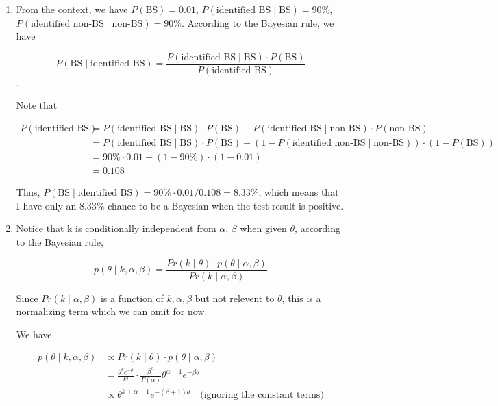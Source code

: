 \documentclass[11pt]{article}
\begin{document}

\begin{enumerate}
    \item From the context, we have $P(\text{BS}) = 0.01$, 
    $P(\text{identified BS} \mid \text{BS}) = 90\%$,
     $P(\text{identified non-BS} \mid \text{non-BS}) = 90\%$.
    According to the Bayesian rule, we have

    $$
    P(\text{BS} \mid \text{identified BS}) = \frac{P(\text{identified BS} \mid \text{BS}) \cdot P(\text{BS})}{P(\text{identified BS})}
    $$.

    Note that

    $$
    \begin{aligned}
        P(\text{identified BS}) 
        &= P(\text{identified BS} \mid \text{BS}) \cdot P(\text{BS}) + P(\text{identified BS} \mid \text{non-BS}) \cdot P(\text{non-BS}) \\
        &= P(\text{identified BS} \mid \text{BS}) \cdot P(\text{BS}) + (1 - P(\text{identified non-BS} \mid \text{non-BS})) \cdot (1 - P(\text{BS})) \\
        &= 90\% \cdot 0.01 + (1 - 90\%) \cdot (1 - 0.01) \\
        &= 0.108
    \end{aligned}
    $$

    Thus, $P(\text{BS} \mid \text{identified BS}) = 90\% \cdot 0.01 / 0.108 = 8.33\%$, which means that I have only an $8.33\%$ chance to be a Bayesian when the test result is positive.

    \item Notice that k is conditionally independent from $\alpha$, $\beta$ when given $\theta$, according to the Bayesian rule,
    
    $$
        p(\theta \mid k, \alpha, \beta) = \frac{Pr(k \mid \theta) \cdot p(\theta \mid \alpha, \beta)}{Pr(k \mid \alpha, \beta)}
    $$

    Since $Pr(k \mid \alpha, \beta)$ is a function of $k, \alpha ,\beta$ but not relevent to $\theta$, this is a normalizing term which we can omit for now.

    We have

    $$
    \begin{aligned}
        p(\theta \mid k, \alpha, \beta) 
        &\propto Pr(k \mid \theta) \cdot p(\theta \mid \alpha, \beta) \\
        &= \frac{\theta^{k}e^{-\theta}}{k!} \cdot \frac{\beta^{\alpha}}{\Gamma(\alpha)} \theta^{\alpha-1} e^{-\beta\theta} \\
        &\propto \theta^{k+\alpha-1}e^{-(\beta+1)\theta} \quad \text{(ignoring the constant terms)}
    \end{aligned}
    $$


\end{enumerate}
\end{document}
